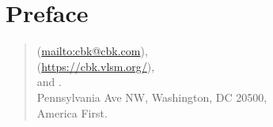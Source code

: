 
\pagebreak

\chapter{Preface}
\lipsum[1-2]

\begin{verse} 
\begin{small} 
\noindent%
\authora{ }(\url{mailto:cbk@cbk.com}), \\
\noindent%
\authorb{ }(\url{https://cbk.vlsm.org/}), \\
\noindent%
and 
\authorc. \\
 Pennsylvania Ave NW, Washington, DC 20500,\\
\noindent%
America First.\\
\end{small} 
\end{verse} 
\clearpage

\tableofcontents
\clearpage

\listoffigures
\clearpage

\listoftables
\clearpage

\enlargethispage{\baselineskip}
\mainmatter
{}

